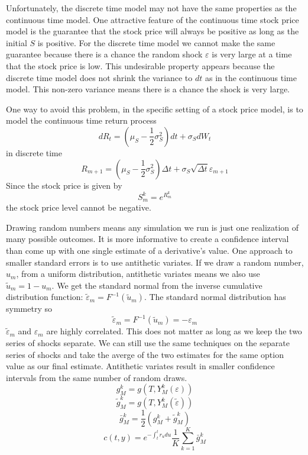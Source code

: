 Unfortunately, the discrete time model may not have the same properties as the
continuous time model. One attractive feature of the continuous time stock
price model is the guarantee that the stock price will always be positive as
long as the initial $S$ is positive. For the discrete time model we cannot make
the same guarantee because there is a chance the random shock $\varepsilon$ is
very large at a time that the stock price is low. This undesirable property
appears because the discrete time model does not shrink the variance to $dt$
as in the continuous time model. This non-zero variance means there is a chance
the shock is very large.

One way to avoid this problem, in the specific setting of a stock price model,
is to model the continuous time return process
\[dR_t=(\mu_S-\frac{1}{2}\sigma_S^2)dt+\sigma_SdW_t\]
in discrete time
\[
    R_{m+1}=(\mu_S-\frac{1}{2}\sigma_S^2)\Delta t+
    \sigma_S\sqrt{\Delta t}\varepsilon_{m+1}
\]
Since the stock price is given by
\[S_m^k=e^{R_m^k}\]
the stock price level cannot be negative.

Drawing random numbers means any simulation we run is just one realization of
many possible outcomes. It is more informative to create a confidence interval
than come up with one single estimate of a derivative's value. One approach to
smaller standard errors is to use antithetic variates. If we draw a random
number, $u_m$, from a uniform distribution, antithetic variates means we also
use $\tilde{u}_m=1-u_m$. We get the standard normal from the inverse cumulative
distribution function: $\tilde{\varepsilon}_m=F^{-1}(\tilde{u}_m)$. The
standard normal distribution has symmetry so
\[\tilde{\varepsilon}_m=F^{-1}(\tilde{u}_m)=-\varepsilon_m\]
$\tilde{\varepsilon}_m$ and $\varepsilon_m$ are highly correlated. This does
not matter as long as we keep the two series of shocks separate. We can still
use the same techniques on the separate series of shocks and take the averge of
the two estimates for the same option value as our final estimate. Antithetic
variates result in smaller confidence intervals from the same number of random
draws.
\[g_M^k=g(T,Y_M^k(\varepsilon))\]
\[\tilde{g}_M^k=g(T,Y_M^k(\tilde{\varepsilon}))\]
\[\bar{g}_M^k=\frac{1}{2}(g_M^k+\tilde{g}_M^k)\]
\[c(t,y)=e^{-\int_t^tr_udu}\frac{1}{K}\sum_{k=1}^K\bar{g}_M^k\]
